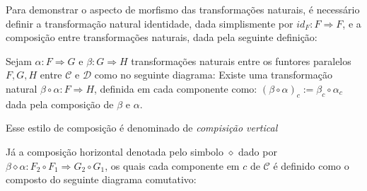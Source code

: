 \documentclass[../main.tex]{subfiles}
\begin{document}
Para demonstrar o aspecto de morfismo das transformações naturais, é necessário definir a transformação natural identidade, dada simplismente por $id_F : F \Rightarrow F$, e a composição entre transformações naturais, dada pela seguinte definição:

\begin{definition}
    Sejam $\alpha : F \Rightarrow G$ e $\beta : G \Rightarrow H$ transformações naturais entre os funtores paralelos $F, G, H$ entre $\mathcal{C}$ e $\mathcal{D}$ como no seguinte diagrama:
    Existe uma transformação natural $\beta \circ \alpha : F \Rightarrow H$, definida em cada componente como: $(\beta \circ \alpha)_c := \beta_c \circ \alpha_c$ dada pela composição de $\beta$ e $\alpha$.
\end{definition}

Esse estilo de composição é denominado de \emph{compisição vertical}

Já a composição horizontal denotada pelo simbolo $\diamond$ dado por $\beta \diamond \alpha : F_2 \circ F_1 \Rightarrow G_2 \circ G_1$, os quais cada componente em $c$ de $\mathcal{C}$ é definido como o composto do seguinte diagrama comutativo:

\end{document}
